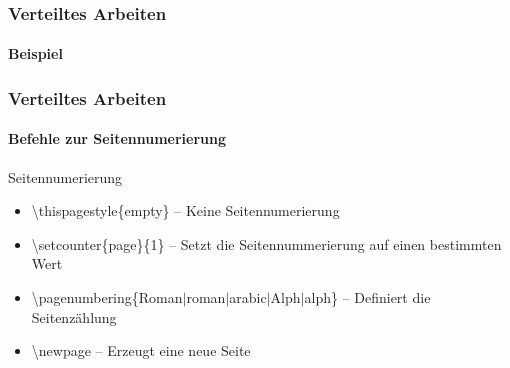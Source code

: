 

\begin{frame}
\frametitle{Verteiltes Arbeiten}
\framesubtitle{Beispiel}




\end{frame}




\begin{frame}
\frametitle{Verteiltes Arbeiten}
\framesubtitle{Befehle zur Seitennumerierung}
\begin{block}{Seitennumerierung}
\begin{itemize}
\item \color{nounibaredI}\textbackslash thispagestyle\color{black}\{empty\} -- Keine Seitennumerierung
\item \color{nounibaredI}\textbackslash setcounter\color{black}\{page\}\{1\} -- Setzt die Seitennummerierung auf einen bestimmten Wert
\item \color{nounibaredI}\textbackslash pagenumbering\color{black}\{Roman$\mid$roman$\mid$arabic$\mid$Alph$\mid$alph\} -- Definiert die Seitenz\"ahlung
\item \color{nounibaredI}\textbackslash  newpage \color{black}-- Erzeugt eine neue Seite
\end{itemize}
\end{block}
\end{frame}
